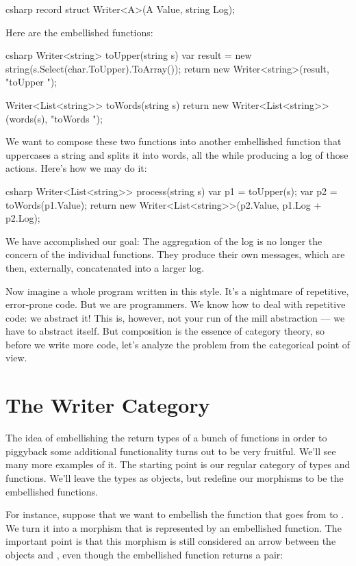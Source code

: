 \begin{snip}{csharp}
record struct Writer<A>(A Value, string Log);
\end{snip}
Here are the embellished functions:

\begin{snip}{csharp}
Writer<string> toUpper(string s) {
    var result = new string(s.Select(char.ToUpper).ToArray());
    return new Writer<string>(result, "toUpper ");
}

Writer<List<string>> toWords(string s) {
    return new Writer<List<string>>(words(s), "toWords ");
}
\end{snip}
We want to compose these two functions into another embellished function
that uppercases a string and splits it into words, all the while
producing a log of those actions. Here's how we may do it:

\begin{snip}{csharp}
Writer<List<string>> process(string s) {
    var p1 = toUpper(s);
    var p2 = toWords(p1.Value);
    return new Writer<List<string>>(p2.Value, p1.Log + p2.Log);
}
\end{snip}
We have accomplished our goal: The aggregation of the log is no longer
the concern of the individual functions. They produce their own
messages, which are then, externally, concatenated into a larger log.

Now imagine a whole program written in this style. It's a nightmare of
repetitive, error-prone code. But we are programmers. We know how to
deal with repetitive code: we abstract it! This is, however, not your
run of the mill abstraction --- we have to abstract  itself. But composition is the essence of category theory,
so before we write more code, let's analyze the problem from the
categorical point of view.

\section{The Writer Category}

The idea of embellishing the return types of a bunch of functions in
order to piggyback some additional functionality turns out to be very
fruitful. We'll see many more examples of it. The starting point is our
regular category of types and functions. We'll leave the types as
objects, but redefine our morphisms to be the embellished functions.

For instance, suppose that we want to embellish the function
 that goes from  to . We turn it
into a morphism that is represented by an embellished function. The
important point is that this morphism is still considered an arrow
between the objects  and , even though the
embellished function returns a pair:

